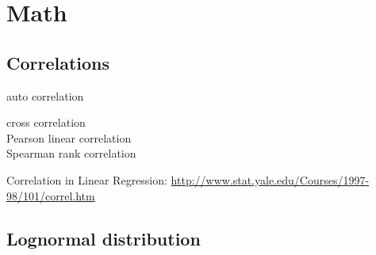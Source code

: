 
\chapter{Math}
\label{chap:math}



\section{Correlations}
\label{sec:correlations}

auto correlation

cross correlation\\
Pearson linear correlation\\
Spearman rank correlation

Correlation in Linear Regression: \url{http://www.stat.yale.edu/Courses/1997-98/101/correl.htm}\\


\section{Lognormal distribution}
\label{sec:lognormal_distribution}

